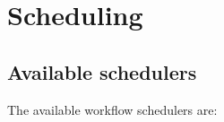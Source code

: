 %
%
%
%


\section{Scheduling}

\label{sec:wf_sched}

\subsection{Available schedulers}

The available \madag workflow schedulers are:

